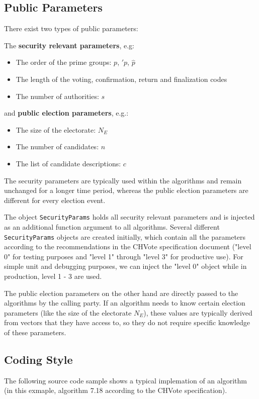 \subsection{Public Parameters}
There exist two types of public parameters:

The \textbf{security relevant parameters}, e.g:

\begin{itemize}
	\item The order of the prime groups: $p$, $\prime{p}$, $\hat{p}$
	\item The length of the voting, confirmation, return and finalization codes
	\item The number of authorities: $s$
\end{itemize}

and \textbf{public election parameters}, e.g.:

\begin{itemize}
	\item The size of the electorate: $N_E$
	\item The number of candidates: $n$
	\item The list of candidate descriptions: $c$
\end{itemize}

The security parameters are typically used within the algorithms and remain unchanged for a longer time period, whereas the public election parameters are different for every election event.

The object \texttt{SecurityParams} holds all security relevant parameters and is injected as an additional function argument to all algorithms. Several different \texttt{SecurityParams} objects are created initially, which contain all the parameters according to the recommendations in the CHVote specification document ("level 0" for testing purposes and "level 1" through "level 3" for productive use). For simple unit and debugging purposes, we can inject the "level 0" object while in production, level 1 - 3 are used.

The public election parameters on the other hand are directly passed to the algorithms by the calling party. If an algorithm needs to know certain election parameters (like the size of the electorate $N_E$), these values are typically derived from vectors that they have access to, so they do not require specific knowledge of these parameters.

\subsection{Coding Style}
The following source code sample shows a typical implemation of an algorithm (in this exmaple, algorithm 7.18 according to the CHVote specification).

